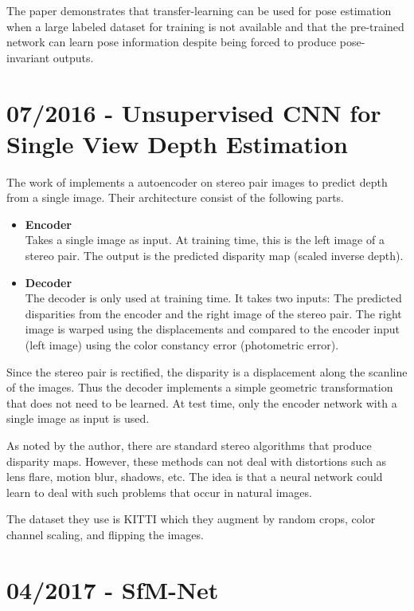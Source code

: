 		The paper demonstrates that transfer-learning can be used for pose estimation when a large labeled dataset for training is not available and that the pre-trained network can learn pose information despite being forced to produce pose-invariant outputs.
		
		
	\section{07/2016 - Unsupervised CNN for Single View Depth Estimation}
		
		The work of \cite{garg2016} implements a autoencoder on stereo pair images to predict depth from a single image.
		Their architecture consist of the following parts.
		\begin{itemize}
			\item \textbf{Encoder}
				\\
				Takes a single image as input. 
				At training time, this is the left image of a stereo pair.
				The output is the predicted disparity map (scaled inverse depth).
			\item \textbf{Decoder}
				\\
				The decoder is only used at training time.
				It takes two inputs: The predicted disparities from the encoder and the right image of the stereo pair.
				The right image is warped using the displacements and compared to the encoder input (left image) using the color constancy error (photometric error).
		\end{itemize}
		Since the stereo pair is rectified, the disparity is a displacement along the scanline of the images.
		Thus the decoder implements a simple geometric transformation that does not need to be learned.
		At test time, only the encoder network with a single image as input is used.
		
		As noted by the author, there are standard stereo algorithms that produce disparity maps.
		However, these methods can not deal with distortions such as lens flare, motion blur, shadows, etc.
		The idea is that a neural network could learn to deal with such problems that occur in natural images.
		
		The dataset they use is {KITTI} \cite{Geiger2012KITTI} which they augment by random crops, color channel scaling, and flipping the images.
		
	
	\section{04/2017 - SfM-Net}
		
